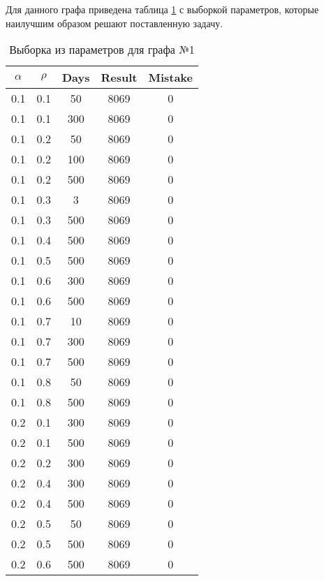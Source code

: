 Для данного графа приведена таблица \ref{tbl:table_graph1} с выборкой параметров, которые наилучшим образом решают поставленную задачу.

\clearpage

\begin{table}[ht]
	\small
	\begin{center}
		\begin{threeparttable}
			\caption{Выборка из параметров для графа №1}
			\label{tbl:table_graph1}
			\begin{tabular}{|c|c|c|c|c|}
				\hline
				$\alpha$ & $\rho$ & Days & Result & Mistake \\ 
				\hline
				0.1 &  0.1 &   50 &  8069 &     0 \\
				0.1 &  0.1 &  300 &  8069 &     0 \\
				0.1 &  0.2 &   50 &  8069 &     0 \\
				0.1 &  0.2 &  100 &  8069 &     0 \\
				0.1 &  0.2 &  500 &  8069 &     0 \\
				0.1 &  0.3 &    3 &  8069 &     0 \\
				0.1 &  0.3 &  500 &  8069 &     0 \\
				0.1 &  0.4 &  500 &  8069 &     0 \\
				0.1 &  0.5 &  500 &  8069 &     0 \\
				0.1 &  0.6 &  300 &  8069 &     0 \\
				0.1 &  0.6 &  500 &  8069 &     0 \\
				0.1 &  0.7 &   10 &  8069 &     0 \\
				0.1 &  0.7 &  300 &  8069 &     0 \\
				0.1 &  0.7 &  500 &  8069 &     0 \\
				0.1 &  0.8 &   50 &  8069 &     0 \\
				0.1 &  0.8 &  500 &  8069 &     0 \\ \hline
				0.2 &  0.1 &  300 &  8069 &     0 \\
				0.2 &  0.1 &  500 &  8069 &     0 \\
				0.2 &  0.2 &  300 &  8069 &     0 \\
				0.2 &  0.4 &  300 &  8069 &     0 \\
				0.2 &  0.4 &  500 &  8069 &     0 \\
				0.2 &  0.5 &   50 &  8069 &     0 \\
				0.2 &  0.5 &  500 &  8069 &     0 \\
				0.2 &  0.6 &  500 &  8069 &     0 \\

\end{tabular}
\end{threeparttable}
\end{center}
\end{table}
